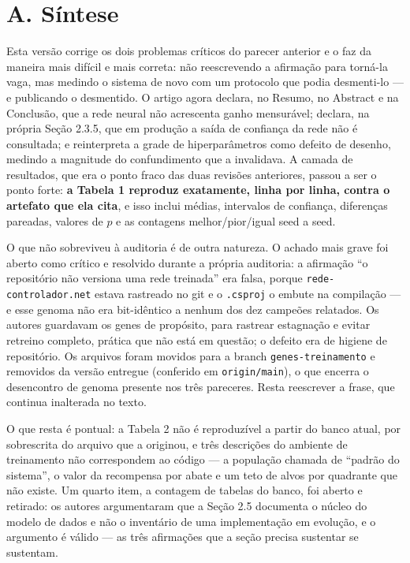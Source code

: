 \documentclass[11pt,a4paper]{article}
\begin{document}
\vspace{0.5em}

\section*{A. Síntese}

Esta versão corrige os dois problemas críticos do parecer anterior e o faz da maneira mais difícil e
mais correta: não reescrevendo a afirmação para torná-la vaga, mas medindo o sistema de novo com um
protocolo que podia desmenti-lo --- e publicando o desmentido. O artigo agora declara, no Resumo,
no Abstract e na Conclusão, que a rede neural não acrescenta ganho mensurável; declara, na própria
Seção 2.3.5, que em produção a saída de confiança da rede não é consultada; e reinterpreta a grade
de hiperparâmetros como defeito de desenho, medindo a magnitude do confundimento que a invalidava.
A camada de resultados, que era o ponto fraco das duas revisões anteriores, passou a ser o ponto
forte: \textbf{a Tabela 1 reproduz exatamente, linha por linha, contra o artefato que ela cita}, e
isso inclui médias, intervalos de confiança, diferenças pareadas, valores de $p$ e as contagens
melhor/pior/igual seed a seed.

O que não sobreviveu à auditoria é de outra natureza. O achado mais grave foi aberto como crítico e
resolvido durante a própria auditoria: a afirmação ``o repositório não versiona uma rede treinada''
era falsa, porque \texttt{rede-controlador.net} estava rastreado no git e o \texttt{.csproj} o embute
na compilação --- e esse genoma não era bit-idêntico a nenhum dos dez campeões relatados. Os autores
guardavam os genes de propósito, para rastrear estagnação e evitar retreino completo, prática que
não está em questão; o defeito era de higiene de repositório. Os arquivos foram movidos para a branch
\texttt{genes-treinamento} e removidos da versão entregue (conferido em \texttt{origin/main}), o que
encerra o desencontro de genoma presente nos três pareceres. Resta reescrever a frase, que continua
inalterada no texto.

O que resta é pontual: a Tabela 2 não é reproduzível a partir do banco atual, por sobrescrita do
arquivo que a originou, e três descrições do ambiente de treinamento não correspondem ao código ---
a população chamada de ``padrão do sistema'', o valor da recompensa por abate e um teto de alvos por
quadrante que não existe. Um quarto item, a contagem de tabelas do banco, foi aberto e retirado: os
autores argumentaram que a Seção 2.5 documenta o núcleo do modelo de dados e não o inventário de uma
implementação em evolução, e o argumento é válido --- as três afirmações que a seção precisa sustentar
se sustentam.
\end{document}
